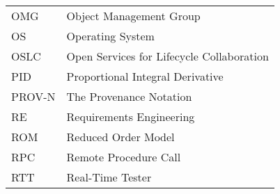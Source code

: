 \begin{longtable}{ll}
OMG     &Object Management Group\\
OS	&Operating System\\
OSLC & Open Services for Lifecycle Collaboration\\
PID     &Proportional Integral Derivative \\
PROV-N  &The Provenance Notation\\
RE & Requirements Engineering \\
ROM & Reduced Order Model\\
RPC     &Remote Procedure Call\\
RTT & Real-Time Tester\\

\end{longtable}
